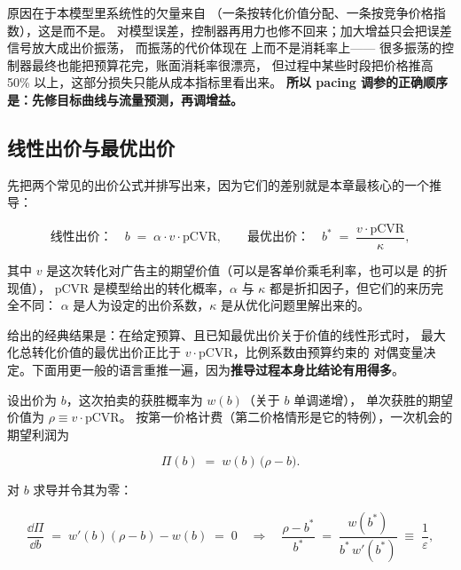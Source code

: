 原因在于本模型里系统性的欠量来自
（一条按转化价值分配、一条按竞争价格指数），这是而不是。
对模型误差，控制器再用力也修不回来；加大增益只会把误差信号放大成出价振荡，
而振荡的代价体现在  上而不是消耗率上——
很多振荡的控制器最终也能把预算花完，账面消耗率很漂亮，
但过程中某些时段把价格推高 50\% 以上，这部分损失只能从成本指标里看出来。
\textbf{所以 pacing 调参的正确顺序是：先修目标曲线与流量预测，再调增益。}

\subsection{线性出价与最优出价}

先把两个常见的出价公式并排写出来，因为它们的差别就是本章最核心的一个推导：

\begin{equation}
\text{线性出价：}\quad b \;=\; \alpha \cdot v \cdot \mathrm{pCVR},
\qquad
\text{最优出价：}\quad b^{*} \;=\; \frac{v \cdot \mathrm{pCVR}}{\kappa},
\label{eq:bid-linear-vs-optimal}
\end{equation}

其中 $v$ 是这次转化对广告主的期望价值（可以是客单价乘毛利率，也可以是  的折现值），
$\mathrm{pCVR}$ 是模型给出的转化概率，$\alpha$ 与 $\kappa$ 都是折扣因子，但它们的来历完全不同：
$\alpha$ 是人为设定的出价系数，$\kappa$ 是从优化问题里解出来的。

\cite{zhang2016ocpc} 给出的经典结果是：在给定预算、且已知最优出价关于价值的线性形式时，
最大化总转化价值的最优出价正比于 $v \cdot \mathrm{pCVR}$，比例系数由预算约束的
对偶变量决定。下面用更一般的语言重推一遍，因为\textbf{推导过程本身比结论有用得多}。

设出价为 $b$，这次拍卖的获胜概率为 $w(b)$（关于 $b$ 单调递增），
单次获胜的期望价值为 $\rho \equiv v \cdot \mathrm{pCVR}$。
按第一价格计费（第二价格情形是它的特例），一次机会的期望利润为

\begin{equation}
\Pi(b) \;=\; w(b)\,\big(\rho - b\big) .
\label{eq:profit}
\end{equation}

对 $b$ 求导并令其为零：

\begin{equation}
\frac{\dd \Pi}{\dd b} \;=\; w'(b)(\rho - b) - w(b) \;=\; 0
\quad\Longrightarrow\quad
\frac{\rho - b^{*}}{b^{*}} \;=\; \frac{w(b^{*})}{b^{*}\,w'(b^{*})} \;\equiv\; \frac{1}{\varepsilon},
\label{eq:first-order-bid}
\end{equation}

